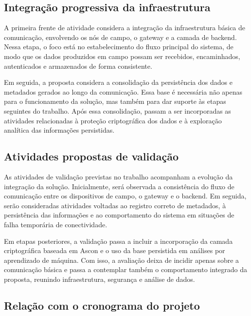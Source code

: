 
\subsection{Integração progressiva da infraestrutura}

A primeira frente de atividade considera a integração da infraestrutura básica de comunicação, envolvendo os nós de campo, o gateway e a camada de backend. Nessa etapa, o foco está no estabelecimento do fluxo principal do sistema, de modo que os dados produzidos em campo possam ser recebidos, encaminhados, autenticados e armazenados de forma consistente.

Em seguida, a proposta considera a consolidação da persistência dos dados e metadados gerados ao longo da comunicação. Essa base é necessária não apenas para o funcionamento da solução, mas também para dar suporte às etapas seguintes do trabalho. Após essa consolidação, passam a ser incorporadas as atividades relacionadas à proteção criptográfica dos dados e à exploração analítica das informações persistidas.


\subsection{Atividades propostas de validação}

As atividades de validação previstas no trabalho acompanham a evolução da integração da solução. Inicialmente, será observada a consistência do fluxo de comunicação entre os dispositivos de campo, o gateway e o backend. Em seguida, serão consideradas atividades voltadas ao registro correto de metadados, à persistência das informações e ao comportamento do sistema em situações de falha temporária de conectividade.

Em etapas posteriores, a validação passa a incluir a incorporação da camada criptográfica baseada em Ascon e o uso da base persistida em análises por aprendizado de máquina. Com isso, a avaliação deixa de incidir apenas sobre a comunicação básica e passa a contemplar também o comportamento integrado da proposta, reunindo infraestrutura, segurança e análise de dados.


\subsection{Relação com o cronograma do projeto}

